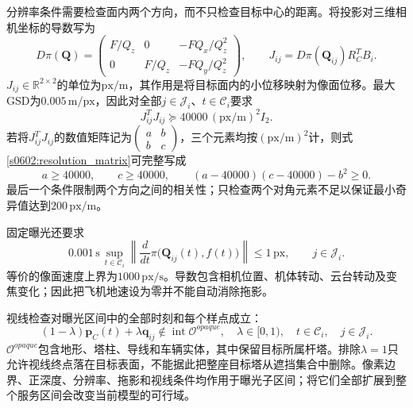 分辨率条件需要检查面内两个方向，而不只检查目标中心的距离。将投影对三维相机坐标的导数写为
\begin{equation}
 D\pi(\mathbf Q)=
 \begin{pmatrix}
 F/Q_z&0&-FQ_x/Q_z^2\\
 0&F/Q_z&-FQ_y/Q_z^2
 \end{pmatrix},
 \qquad
 J_{ij}=D\pi(\mathbf Q_{ij})R_C^TB_i.
 \label{s0602:numeric_jacobian}
\end{equation}
$J_{ij}\in\mathbb R^{2\times2}$的单位为$\mathrm{px/m}$，其作用是将目标面内的小位移映射为像面位移。最大GSD为$0.005\,\mathrm{m/px}$，因此对全部$j\in\mathcal J_i$、$t\in\mathcal C_i$要求
\begin{equation}
 J_{ij}^TJ_{ij}\succeq
 40000\,(\mathrm{px/m})^2I_2.
 \label{s0602:resolution_matrix}
\end{equation}
若将$J_{ij}^TJ_{ij}$的数值矩阵记为$\begin{pmatrix}a&b\\b&c\end{pmatrix}$，三个元素均按$(\mathrm{px/m})^2$计，则式\eqref{s0602:resolution_matrix}可完整写成
\begin{equation}
 a\ge40000,\qquad c\ge40000,\qquad
 (a-40000)(c-40000)-b^2\ge0.
 \label{s0602:resolution_scalar}
\end{equation}
最后一个条件限制两个方向之间的相关性；只检查两个对角元素不足以保证最小奇异值达到$200\,\mathrm{px/m}$。

固定曝光还要求
\begin{equation}
 0.001\,\mathrm s\,
 \sup_{t\in\mathcal C_i}
 \left\|\frac{d}{dt}\pi\bigl(\mathbf Q_{ij}(t),f(t)\bigr)\right\|
 \le1\,\mathrm{px},
 \qquad j\in\mathcal J_i.
 \label{s0602:numeric_blur}
\end{equation}
等价的像面速度上界为$1000\,\mathrm{px/s}$。导数包含相机位置、机体转动、云台转动及变焦变化；因此把飞机地速设为零并不能自动消除拖影。

视线检查对曝光区间中的全部时刻和每个样点成立：
\begin{equation}
 (1-\lambda)\mathbf p_C(t)+\lambda\mathbf q_{ij}
 \notin\operatorname{int}\mathcal O^{opaque},
 \quad
 \lambda\in[0,1),\quad t\in\mathcal C_i,\quad j\in\mathcal J_i.
 \label{s0602:numeric_visibility}
\end{equation}
$\mathcal O^{opaque}$包含地形、塔柱、导线和车辆实体，其中保留目标所属杆塔。排除$\lambda=1$只允许视线终点落在目标表面，不能据此把整座目标塔从遮挡集合中删除。像素边界、正深度、分辨率、拖影和视线条件均作用于曝光子区间；将它们全部扩展到整个服务区间会改变当前模型的可行域。

